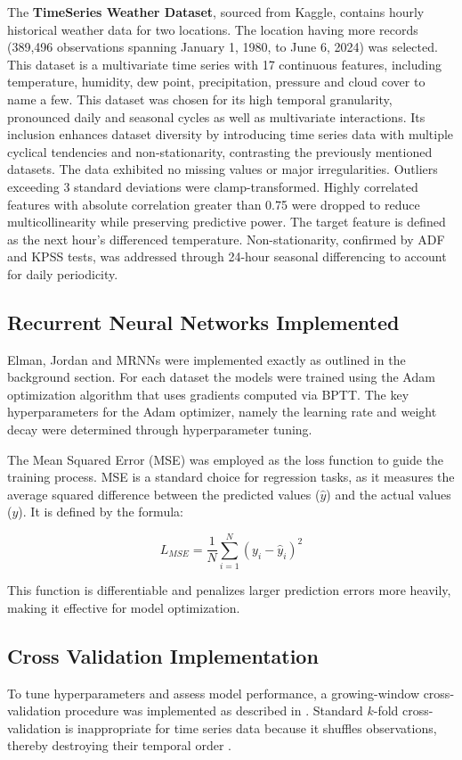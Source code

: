 \documentclass[conference, 10pt]{IEEEtran}
\begin{document}
The \textbf{TimeSeries Weather Dataset}, sourced from Kaggle, contains hourly historical weather data for two locations.
The location having more records (389,496 observations spanning January 1, 1980, to June 6, 2024) was selected. This
dataset is a multivariate time series with 17 continuous features, including temperature, humidity, dew point,
precipitation, pressure and cloud cover to name a few. This dataset was chosen for its high temporal granularity,
pronounced daily and seasonal cycles as well as multivariate interactions. Its inclusion enhances dataset diversity by
introducing time series data with multiple cyclical tendencies and non-stationarity, contrasting the previously
mentioned datasets. The data exhibited no missing values or major irregularities. Outliers exceeding 3 standard
deviations were clamp-transformed. Highly correlated features with absolute correlation greater than 0.75 were dropped
to reduce multicollinearity while preserving predictive power. The target feature is defined as the next hour's
differenced temperature. Non-stationarity, confirmed by ADF and KPSS tests, was addressed through 24-hour seasonal
differencing to account for daily periodicity.

\subsection{Recurrent Neural Networks Implemented}
Elman, Jordan and MRNNs were implemented exactly as outlined in the background section. For each dataset the
models were trained using the Adam optimization algorithm that uses gradients computed via BPTT. The key hyperparameters
for the Adam optimizer, namely the learning rate and weight decay were determined through hyperparameter tuning.

The Mean Squared Error (MSE) was employed as the loss function to guide the training process. MSE is a standard choice
for regression tasks, as it measures the average squared difference between the predicted values ($\hat{y}$) and the actual
values ($y$). It is defined by the formula:

$$L_{MSE} = \frac{1}{N} \sum_{i=1}^{N} (y_i - \hat{y}_i)^2$$ 

This function is differentiable and penalizes larger prediction errors more heavily, making it effective for model
optimization.

\subsection{Cross Validation Implementation}
To tune hyperparameters and assess model performance, a growing-window cross-validation procedure was implemented as
described in \cite{CrossValidationTimeseries}. Standard $k$-fold cross-validation is inappropriate for time series data
because it shuffles observations, thereby destroying their temporal order \cite{CrossValidationTimeseries}.
\end{document}
